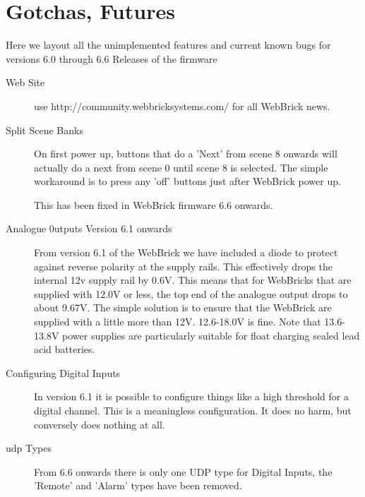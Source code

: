 \section{Gotchas, Futures}

Here we layout all the unimplemented features and current known bugs for versions 6.0 through 6.6 Releases of the firmware

\begin{description}

\item [Web Site] use http://community.webbricksystems.com/ for all WebBrick news.

\item [Split Scene Banks]

	On first power up, buttons that do a 'Next' from scene 8 onwards will actually do a next from scene 0
	until scene 8 is selected.  The simple workaround is to press any 'off' buttons just after WebBrick power up.

    This has been fixed in WebBrick firmware 6.6 onwards. 


\item[Analogue 0utputs Version 6.1 onwards]

From version 6.1 of the WebBrick we have included a diode to protect against reverse polarity at the supply rails. 
This effectively drops the internal 12v supply rail by 0.6V.  This means that for WebBricks that are supplied with 
12.0V or less, the top end of the analogue output drops to about 9.67V.  The simple solution is to ensure that the 
WebBrick are supplied with a little more than 12V.  12.6-18.0V is fine.  Note that 13.6-13.8V power supplies are 
particularly suitable for float charging sealed lead acid batteries.

\item[Configuring Digital Inputs]

In version 6.1 it is possible to configure things like a high threshold for a digital channel. 
This is a meaningless configuration. It does no harm, but conversely does nothing at all.

\item[udp Types]

  From 6.6 onwards there is only one UDP type for Digital Inputs, the 'Remote' and 'Alarm' types have been removed.


\end{description}
